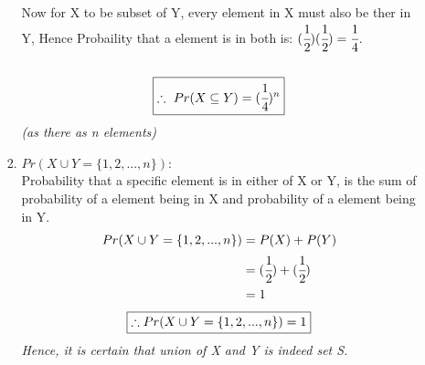 \documentclass{article}
\begin{document}
\begin{enumerate}
\begin{enumerate}
\begin{enumerate}
      \textnormal{Now for X to be subset of Y, every element in X must also be ther in Y, Hence Probaility that}
      \textnormal{a element is in both is: $(\cfrac{1}{2})(\cfrac{1}{2}) = \cfrac{1}{4}$.}\\\\
      \[
        \boxed{\therefore\  Pr(X \subseteq Y) = (\cfrac{1}{4})^n}\\
      \]\textit{(as there as n elements)}\\
      \item $Pr(X \cup Y = \{1, 2,..., n\})$:\\
      \textnormal{Probability that a specific element is in either of X or Y, is the sum of probability of a element being in X and probability of a element being in Y.}
      \begin{align*}
        Pr(X \cup Y = \{1, 2,..., n\}) &= P(X) + P(Y)\\
        &= (\cfrac{1}{2})+(\cfrac{1}{2})\\
        &= 1
      \end{align*}
      \[
        \boxed{\therefore Pr(X \cup Y = \{1, 2,..., n\}) = 1}\\
      \]
      \textit{Hence, it is certain that union of X and Y is indeed set S.}
    \end{enumerate}
  \end{enumerate}

\end{enumerate}
\end{document}
